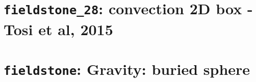 \documentclass[a4paper]{article}
\begin{document}
\newpage
\section{{\tt fieldstone\_28}: convection 2D box - Tosi et al, 2015 \label{f28}}






\newpage
\section{{\tt fieldstone}: Gravity: buried sphere}


\appendix

\newpage
%

\newpage %

\printindex %

\newpage %
\listoftodos[Notes] %
\end{document}
